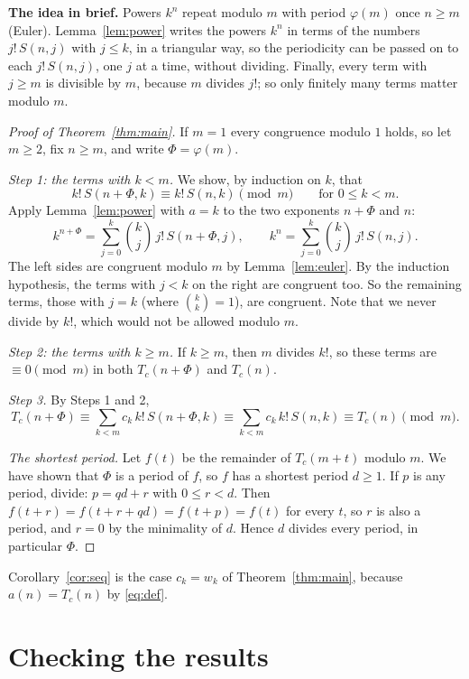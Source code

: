 \documentclass[11pt,a4paper]{article}
\theoremstyle{definition}
\theoremstyle{remark}
\newcommand{\para}[1]{\par\medskip\noindent\textbf{#1}\enspace}
\begin{document}
\para{The idea in brief.} Powers $k^n$ repeat modulo $m$ with period $\varphi(m)$ once $n\ge m$ (Euler).
Lemma~\ref{lem:power} writes the powers $k^n$ in terms of the numbers $j!\,S(n,j)$ with $j\le k$, in a triangular way, so
the periodicity can be passed on to each $j!\,S(n,j)$, one $j$ at a time, without dividing. Finally, every term with
$j\ge m$ is divisible by $m$, because $m$ divides $j!$; so only finitely many terms matter modulo $m$.

\begin{proof}[Proof of Theorem~\ref{thm:main}]
If $m=1$ every congruence modulo $1$ holds, so let $m\ge2$, fix $n\ge m$, and write $\Phi=\varphi(m)$.

\emph{Step 1: the terms with $k<m$.} We show, by induction on $k$, that
\[
k!\,S(n+\Phi,k)\equiv k!\,S(n,k)\pmod m\qquad\text{for }0\le k<m.
\]
Apply Lemma~\ref{lem:power} with $a=k$ to the two exponents $n+\Phi$ and $n$:
\[
k^{n+\Phi}=\sum_{j=0}^{k}\binom kj\,j!\,S(n+\Phi,j),\qquad
k^{n}=\sum_{j=0}^{k}\binom kj\,j!\,S(n,j).
\]
The left sides are congruent modulo $m$ by Lemma~\ref{lem:euler}. By the induction hypothesis, the terms with $j<k$ on the
right are congruent too. So the remaining terms, those with $j=k$ (where $\binom kk=1$), are congruent. Note that we never
divide by $k!$, which would not be allowed modulo $m$.

\emph{Step 2: the terms with $k\ge m$.} If $k\ge m$, then $m$ divides $k!$, so these terms are $\equiv0\pmod m$ in both
$T_c(n+\Phi)$ and $T_c(n)$.

\emph{Step 3.} By Steps 1 and 2,
\[
T_c(n+\Phi)\equiv\sum_{k<m}c_k\,k!\,S(n+\Phi,k)\equiv\sum_{k<m}c_k\,k!\,S(n,k)\equiv T_c(n)\pmod m .
\]

\emph{The shortest period.} Let $f(t)$ be the remainder of $T_c(m+t)$ modulo $m$. We have shown that $\Phi$ is a period of
$f$, so $f$ has a shortest period $d\ge1$. If $p$ is any period, divide: $p=qd+r$ with $0\le r<d$. Then
$f(t+r)=f(t+r+qd)=f(t+p)=f(t)$ for every $t$, so $r$ is also a period, and $r=0$ by the minimality of $d$. Hence $d$
divides every period, in particular $\Phi$.
\end{proof}

Corollary~\ref{cor:seq} is the case $c_k=w_k$ of Theorem~\ref{thm:main}, because $a(n)=T_c(n)$ by \eqref{eq:def}.

\section{Checking the results}\label{sec:checks}
\end{document}
